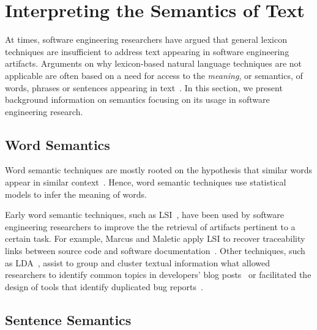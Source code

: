 

\section{Interpreting the Semantics of Text}
\label{cp2:artifact-semantics}






At times, software engineering researchers have argued
that general lexicon techniques 
are insufficient to address text appearing in
software engineering artifacts. 
Arguments on why lexicon-based natural 
language techniques are not applicable are often based
on a need for access to the \textit{meaning}, or semantics, 
of words, phrases or sentences appearing in text~\cite{jurafsky2014speech}.
In this section, 
we present background information on semantics focusing on
its usage in software engineering research.



\subsection{Word Semantics}

Word semantic techniques are mostly rooted on the hypothesis
that similar words appear in similar context~\cite{harris1954distributional}.
Hence, word semantic techniques use statistical models to infer the meaning of words. 


Early word semantic techniques, such as \acf{LSI}~\cite{deerwester1990LSI}, 
have been used by software engineering researchers 
to improve the 
the retrieval of artifacts pertinent to a certain task. 
For example, Marcus and Maletic apply \acf{LSI} to 
recover traceability links between source code and
software documentation~\cite{marcus2003}.
Other techniques, such as \acf{LDA}~\cite{blei2003latent},
assist to group and cluster textual information 
what allowed researchers to identify common topics in developers' blog posts~\cite{Pagano2011}
or facilitated the design of tools that identify duplicated bug reports~\cite{nguyen2012}.








\subsection{Sentence Semantics}







